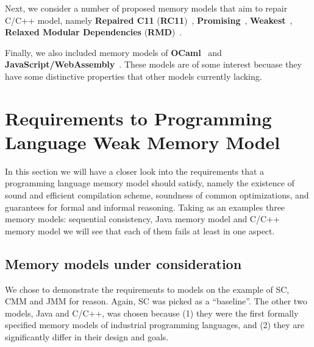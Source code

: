 \documentclass[a4paper,twoside,11pt]{article}
\numberwithin{equation}{section}
\begin{document}
Next, we consider a number of proposed memory models 
that aim to repair C/C++ model, namely 
\textbf{Repaired C11} (\textbf{RC11})~\cite{Lahav-al:PLDI17}, 
\textbf{Promising}~\cite{Kang-al:POPL17, Lee-el:PLDI20}, 
\textbf{Weakest}~\cite{Chakraborty-Vafeiadis:POPL19}, 
\textbf{Relaxed Modular Dependencies} (\textbf{RMD})~\cite{Paviotti-el:ESOP20}.



Finally, we also included memory models of \textbf{OCaml}~\cite{Dolan-al:PLDI18}
and \textbf{JavaScript/WebAssembly}~\cite{Watt-el:PLDI2020}.
These models are of some interest becuase 
they have some distinctive properties
that other models currently lacking.


\section{Requirements to Programming Language Weak Memory Model}

In this section we will have a closer look into the requirements 
that a programming language memory model should satisfy, 
namely the existence of sound and efficient compilation scheme, 
soundness of common optimizations, and guarantees for formal and informal reasoning.  
Taking as an examples three memory models: 
sequential consistency, Java memory model and C/C++ memory model
we will see that each of them fails at least in one aspect.

\subsection{Memory models under consideration}

We chose to demonstrate the requirements to models on the example of SC, CMM and JMM for reason.
Again, SC was picked as a ``baseline''.
The other two models, Java and C/C++, was chosen because 
(1) they were the first formally specified memory models of industrial programming languages, and
(2) they are significantly differ in their design and goals.
\end{document}
